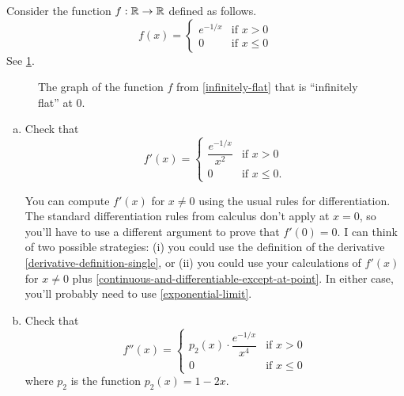 \begin{exercise} \label{infinitely-flat}
	Consider the function $f : \mathbb{R} \to \mathbb{R}$ defined as follows.
	\[ f(x) = \begin{cases} e^{-1/x} & \text{if } x > 0 \\ 0 & \text{if } x \leq 0 \end{cases} \]
	See \cref{infinitely-flat-graph}. 
	\begin{figure}[ht]
		\begin{center}
		\end{center}
		\caption{The graph of the function $f$ from \cref{infinitely-flat} that is ``infinitely flat'' at 0.}  \label{infinitely-flat-graph}
	\end{figure}
	\begin{enumerate}[(a)]
		
		\item Check that
		\[ f'(x) = \begin{cases} \dfrac{e^{-1/x}}{x^2} & \text{if } x > 0 \\ 0 & \text{if } x \leq 0. \end{cases} \]
		
		\begin{hint}
			You can compute $f'(x)$ for $x \neq 0$ using the usual rules for differentiation. The standard differentiation rules from calculus don't apply at $x = 0$, so you'll have to use a different argument to prove that $f'(0) = 0$. I can think of two possible strategies: (i) you could use the definition of the derivative \ref{derivative-definition-single}, or (ii) you could use your calculations of $f'(x)$ for $x \neq 0$ plus \cref{continuous-and-differentiable-except-at-point}. In either case, you'll probably need to use  \cref{exponential-limit}. 
		\end{hint}
		
		\item Check that 
		\[ f''(x) = \begin{cases} p_2(x) \cdot \dfrac{e^{-1/x}}{x^4} & \text{if } x > 0 \\ 0 & \text{if } x \leq 0 \end{cases} \]
		where $p_2$ is the function $p_2(x) = 1-2x$. 
		

\end{enumerate}
\end{exercise}
